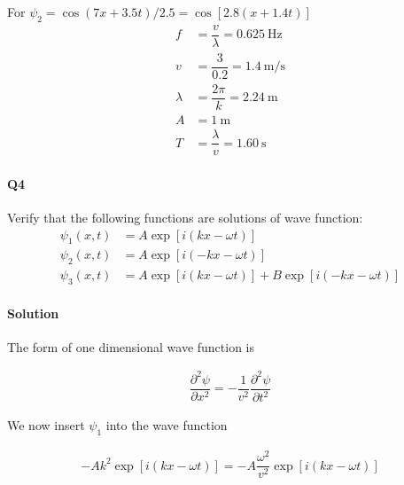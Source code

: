 \documentclass{article}
\begin{document}
For 
$\psi_2 = \cos \left( 7 x + 3.5 t \right) / 2.5 = \cos \left[ 2.8 \left( x + 1.4 t \right) \right]$
\begin{equation*}
  \begin{aligned}
    f &= \dfrac{v}{\lambda} = 0.625 \ \mathrm{Hz}\\
    v &= \dfrac{3}{0.2} = 1.4 \ \mathrm{m/s} \\ 
    \lambda &= \dfrac{2\pi}{k} = 2.24 \ \mathrm{m} \\
    A &= 1 \ \mathrm{m} \\
    T &= \dfrac{\lambda}{v} = 1.60 \ \mathrm{s}
  \end{aligned}
\end{equation*}

\paragraph{Q4}

Verify that the following functions are solutions of wave function:
\begin{equation*}
  \begin{aligned}
    \psi_1 \left( x,t \right) &= A \exp \left[ i \left( k x - \omega t \right) \right]\\
    \psi_2 \left( x,t \right) &= A \exp \left[ i \left( - k x - \omega t \right)\right] \\
    \psi_3 \left( x,t \right) &= A \exp \left[ i \left( k x - \omega t \right)\right] + B \exp \left[ i \left( - k x - \omega t \right) \right]
  \end{aligned}
\end{equation*}

\paragraph{Solution}

The form of one dimensional wave function is

\begin{equation*}
  \begin{aligned}
    \dfrac{\partial^2 \psi}{\partial x^{2}} = - \dfrac{1}{v^{2}} \dfrac{\partial^{2} \psi}{\partial t^{2}} 
  \end{aligned}
\end{equation*}

We now insert $\psi_1$ into the wave function

\begin{equation*}
  \begin{aligned}
     - A k^2 \exp \left[ i \left( k x - \omega t \right) \right] = - A \dfrac{\omega^2 }{v^{2}} \exp \left[ i \left( k x - \omega t \right)\right]
  \end{aligned}
\end{equation*}
\end{document}
